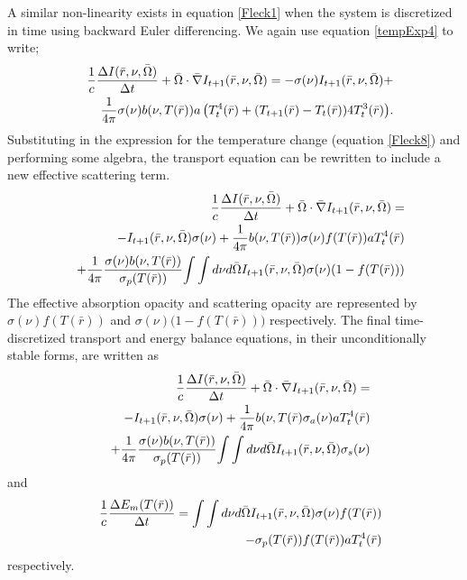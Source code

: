	A similar non-linearity exists in equation \ref{Fleck1} when the system is discretized in time using backward Euler differencing. We again use equation \ref{tempExp4} to write;
	\begin{eqnarray}
	\label{Fleck12}
	&&{1\over{c}}{\Delta{I(\bar{r},\nu,\bar{\Omega})}\over{\Delta{t}}}+\bar{\Omega}\cdot\bar{\nabla}{I_{t+1}(\bar{r},\nu,\bar{\Omega})}= -\sigma(\nu)I_{t+1}(\bar{r},\nu,\bar{\Omega})+\nonumber \\&& {1\over{4\pi}}\sigma(\nu){b(\nu,T(\bar{r}))a\left(T_t^4(\bar{r})+(T_{t+1}(\bar{r})-T_t(\bar{r}))4T^3_t(\bar{r})\right)}.
	\end{eqnarray}
	Substituting in the expression for the temperature change (equation \ref{Fleck8}) and performing some algebra, the transport equation can be rewritten to include a new effective scattering term.
	\begin{eqnarray}
	\label{Fleck13}
	& &{1\over{c}}{\Delta{I(\bar{r},\nu,\bar{\Omega})}\over{\Delta{t}}} + \bar{\Omega}\cdot\bar{\nabla}{I_{t+1}(\bar{r},\nu,\bar{\Omega})}=\nonumber \\& & -I_{t+1}(\bar{r},\nu,\bar{\Omega})\sigma(\nu)+{1\over{4\pi}}b(\nu,T(\bar{r}))\sigma(\nu)f(T(\bar{r}))aT_t^4(\bar{r})\nonumber \\& & +{1\over{4\pi}}{\sigma(\nu)b(\nu,T(\bar{r}))\over{\sigma_p(T(\bar{r}))}}{\int\int{d\nu}{d\bar{\Omega}}I_{t+1}(\bar{r},\nu,\bar{\Omega})\sigma(\nu)(1-f(T(\bar{r})))}
	\end{eqnarray}
	The effective absorption opacity and scattering opacity are represented by ${\sigma(\nu){f(T(\bar{r}))}}$ and ${\sigma(\nu)(1-{f(T(\bar{r}))}})$ respectively.  The final time-discretized transport and energy balance equations, in their unconditionally stable forms, are written as
	\begin{eqnarray}
	\label{finalTransport}
	& &{1\over{c}}{\Delta{I(\bar{r},\nu,\bar{\Omega})}\over{\Delta{t}}} + \bar{\Omega}\cdot\bar{\nabla}{I_{t+1}(\bar{r},\nu,\bar{\Omega})}=\nonumber \\& & -I_{t+1}(\bar{r},\nu,\bar{\Omega})\sigma(\nu)+{1\over{4\pi}}b(\nu,T(\bar{r})\sigma_a(\nu) aT_t^4(\bar{r})\nonumber \\& & +{1\over{4\pi}}{\sigma(\nu)b(\nu,T(\bar{r}))\over{\sigma_p(T(\bar{r}))}}{\int\int{d\nu}{d\bar{\Omega}}I_{t+1}(\bar{r},\nu,\bar{\Omega})\sigma_s(\nu)}
	\end{eqnarray}
	and	
	\begin{eqnarray}
	\label{finalEqState}
	&&{1\over{c}}{\Delta{E_m(T(\bar{r}))}\over{\Delta{t}}}={\int\int{d\nu}{d\bar{\Omega}}I_{t+1}(\bar{r},\nu,\bar{\Omega})\sigma(\nu)f(T(\bar{r}))}\nonumber \\&& 
	-{\sigma_p(T(\bar{r}))f(T(\bar{r})){aT_t^4(\bar{r})}}
	\end{eqnarray}
	respectively.
	
